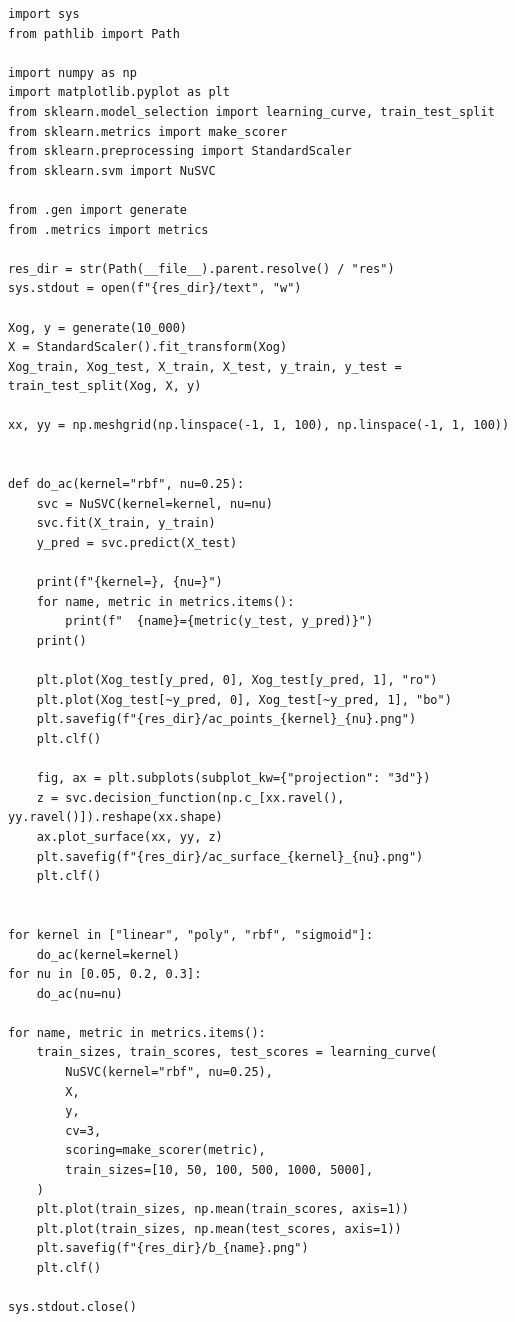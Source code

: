 \documentclass[11pt]{article}
\begin{document}
\begin{verbatim}
import sys
from pathlib import Path

import numpy as np
import matplotlib.pyplot as plt
from sklearn.model_selection import learning_curve, train_test_split
from sklearn.metrics import make_scorer
from sklearn.preprocessing import StandardScaler
from sklearn.svm import NuSVC

from .gen import generate
from .metrics import metrics

res_dir = str(Path(__file__).parent.resolve() / "res")
sys.stdout = open(f"{res_dir}/text", "w")

Xog, y = generate(10_000)
X = StandardScaler().fit_transform(Xog)
Xog_train, Xog_test, X_train, X_test, y_train, y_test = train_test_split(Xog, X, y)

xx, yy = np.meshgrid(np.linspace(-1, 1, 100), np.linspace(-1, 1, 100))


def do_ac(kernel="rbf", nu=0.25):
    svc = NuSVC(kernel=kernel, nu=nu)
    svc.fit(X_train, y_train)
    y_pred = svc.predict(X_test)

    print(f"{kernel=}, {nu=}")
    for name, metric in metrics.items():
        print(f"  {name}={metric(y_test, y_pred)}")
    print()

    plt.plot(Xog_test[y_pred, 0], Xog_test[y_pred, 1], "ro")
    plt.plot(Xog_test[~y_pred, 0], Xog_test[~y_pred, 1], "bo")
    plt.savefig(f"{res_dir}/ac_points_{kernel}_{nu}.png")
    plt.clf()

    fig, ax = plt.subplots(subplot_kw={"projection": "3d"})
    z = svc.decision_function(np.c_[xx.ravel(), yy.ravel()]).reshape(xx.shape)
    ax.plot_surface(xx, yy, z)
    plt.savefig(f"{res_dir}/ac_surface_{kernel}_{nu}.png")
    plt.clf()


for kernel in ["linear", "poly", "rbf", "sigmoid"]:
    do_ac(kernel=kernel)
for nu in [0.05, 0.2, 0.3]:
    do_ac(nu=nu)

for name, metric in metrics.items():
    train_sizes, train_scores, test_scores = learning_curve(
        NuSVC(kernel="rbf", nu=0.25),
        X,
        y,
        cv=3,
        scoring=make_scorer(metric),
        train_sizes=[10, 50, 100, 500, 1000, 5000],
    )
    plt.plot(train_sizes, np.mean(train_scores, axis=1))
    plt.plot(train_sizes, np.mean(test_scores, axis=1))
    plt.savefig(f"{res_dir}/b_{name}.png")
    plt.clf()

sys.stdout.close()
\end{verbatim}
\end{document}
